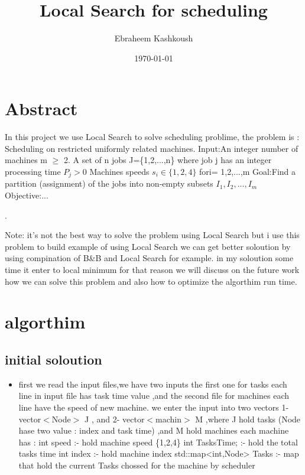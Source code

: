 \documentclass[a4paper,12pt]{report}
\begin{document}
  
  \title{Local Search for scheduling }
\author{Ebraheem Kashkoush}
\date{\today}
\maketitle
  \section{Abstract}
In this project we use Local Search to solve scheduling problime, the problem is : \newline
Scheduling on restricted uniformly related machines.\newline 
Input:An integer number of machines m $\geq$ 2. A set of n jobs J=\{1,2,...,n\} 
where job j has an integer processing time  $P_j > 0$ Machines speeds $s_i \in \{1,2,4\}$  fori= 1,2,...,m\newline
Goal:Find a partition (assignment) of the jobs into non-empty subsets $I_1,I_2,...,I_m$
Objective:...\par . \newline
 
Note: it's not the best way to solve the problem using Local Search but i use this problem to build  example of using Local Search we can get better soloution by using compination of B\&B and Local Search for example.\newline
in my soloution some time it enter to local minimum for that reason we will discuss on the future work how we can solve this problem and also how to optimize the algorthim run time.\par 

  \section{algorthim}
\subsection{initial soloution}
\begin{itemize}
\item first we read the input files,we have two inputs the first one for tasks each line in input file has task time value ,and the second file for machines each line have the speed of new machine.\newline
we enter the input into two vectors 1- vector$<$Node$>$ J , and 2- vector$<$machin$>$ M ,where J hold tasks (Node hase two value : index and task time) ,and M hold machines \newline
each machine has :\newline 
int speed :-  hold machine speed \{1,2,4\}\newline
	int TasksTime; :- hold the total tasks time\newline
	int index :- hold machine index
	std::map<int,Node> Tasks :- map that hold the current Tasks chossed for the machine by scheduler
\end{itemize}
\end{document}
